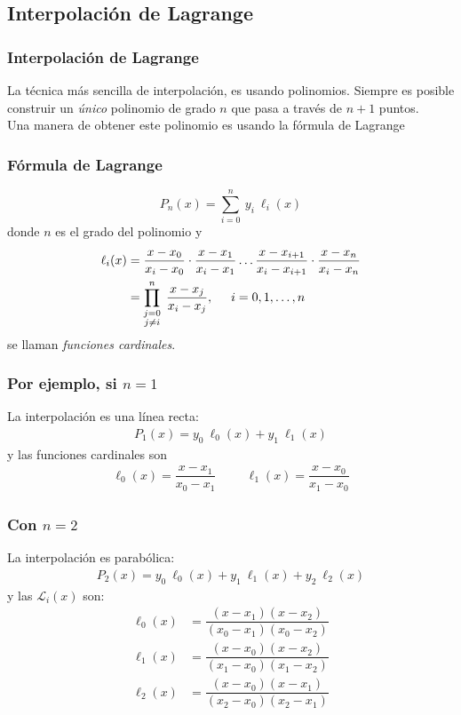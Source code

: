 \subsection{Interpolación de Lagrange}
\begin{frame}
\frametitle{Interpolación de Lagrange}
La técnica más sencilla de interpolación, es usando polinomios. Siempre es posible construir un \emph{único} polinomio de grado $n$ que pasa a través de $n + 1$ puntos.
\\
\medskip
Una manera de obtener este polinomio es usando la fórmula de Lagrange
\end{frame}
\begin{frame}
\frametitle{Fórmula de Lagrange}
\begin{equation}
P_{n}(x) = \sum_{i = 0}^{n} \: y_{i} \: \ell_{i}(x)
\label{eq:ecuacion_03_01a}
\end{equation}
donde $n$ es el grado del polinomio y
\begin{align}
\begin{aligned}
\ell_{i}(x) &= \dfrac{x - x_{0}}{x_{i} - x_{0}} \cdot \dfrac{x - x_{1}}{x_{i} - x_{1}} \ldots \dfrac{x - x_{i + 1}}{x_{i} - x_{i + 1}} \cdot \dfrac{x - x_{n}}{x_{i} - x_{n}} \\
 &= \prod_{\substack{j = 0 \\ j \neq i}}^{n} \; \dfrac{x - x_{j}}{x_{i} - x_{j}}, \hspace{0.5cm} i = 0,1,\ldots,n
\end{aligned}
\label{eq:ecuacion_03_01b}
\end{align}
se llaman \emph{funciones cardinales}.
\end{frame}
\begin{frame}
\frametitle{Por ejemplo, si $n = 1$}
La interpolación es una línea recta:
\begin{align*}
P_{1}(x) = y_{0} \: \ell_{0}(x) + y_{1} \: \ell_{1}(x)
\end{align*}
y las funciones cardinales son
\begin{align*}
\ell_{0}(x) = \dfrac{x - x_{1}}{x_{0} - x_{1}} \hspace{1cm} \ell_{1}(x) = \dfrac{x - x_{0}}{x_{1} - x_{0}}
\end{align*}
\end{frame}
\begin{frame}
\frametitle{Con $n = 2$}
La interpolación es parabólica:
\begin{align*}
P_{2}(x) = y_{0} \: \ell_{0}(x) + y_{1} \: \ell_{1}(x) + y_{2} \: \ell_{2}(x)
\end{align*}
y las $\mathcal{L}_{i}(x)$ son:
\begin{align*}
\ell_{0}(x) &= \dfrac{(x - x_{1})(x - x_{2})}{(x_{0} - x_{1})(x_{0} - x_{2})} \\
\ell_{1}(x) &= \dfrac{(x - x_{0})(x - x_{2})}{(x_{1} - x_{0})(x_{1} - x_{2})} \\
\ell_{2}(x) &= \dfrac{(x - x_{0})(x - x_{1})}{(x_{2} - x_{0})(x_{2} - x_{1})} 
\end{align*}
\end{frame}
